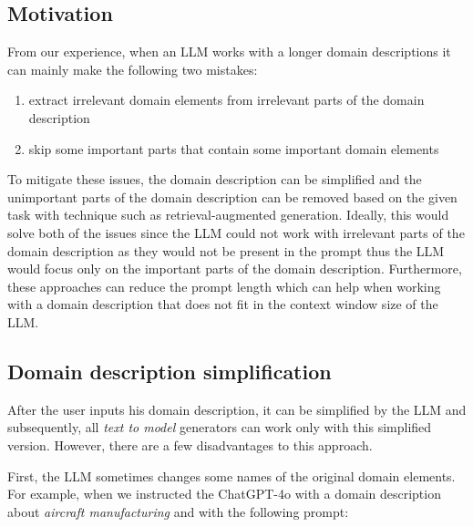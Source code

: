 \subsection{Motivation}

From our experience, when an LLM works with a longer domain descriptions it can mainly make the following two mistakes:

\begin{enumerate}
\item extract irrelevant domain elements from irrelevant parts of the domain description
\item skip some important parts that contain some important domain elements
\end{enumerate}


\noindent{}To mitigate these issues, the domain description can be simplified and the unimportant parts of the domain description can be removed based on the given task with technique such as retrieval-augmented generation. Ideally, this would solve both of the issues since the LLM could not work with irrelevant parts of the domain description as they would not be present in the prompt thus the LLM would focus only on the important parts of the domain description.
Furthermore, these approaches can reduce the prompt length which can help when working with a domain description that does not fit in the context window size of the LLM.



\subsection{Domain description simplification}

After the user inputs his domain description, it can be simplified by the LLM and subsequently, all \emph{text to model} generators can work only with this simplified version. However, there are a few disadvantages to this approach.

First, the LLM sometimes changes some names of the original domain elements. For example, when we instructed the ChatGPT-4o with a domain description about \emph{aircraft manufacturing} and with the following prompt: \\

